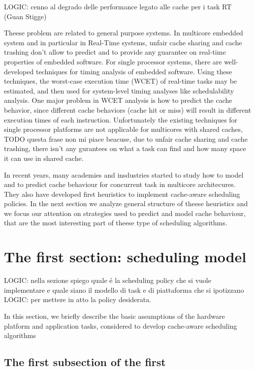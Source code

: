 \documentclass[a4paper,10pt]{article}
\begin{document}
\begin{multicols}{2}
LOGIC: cenno al degrado delle performance legato alle cache per i task RT (Guan Stigge)

Theese problem are related to general purpose systems. In multicore embedded system and in particular in Real-Time systems, unfair cache sharing 
and cache trashing don't allow to predict and to provide any guarantee on real-time properties of embedded software.
For single processor systems, there are well-developed techniques for timing analysis of embedded software.
Using these techniques, the worst-case execution time (WCET) of real-time tasks may be estimated, and then used for system-level 
timing analyses like schedulability analysis. One major problem in  WCET analysis is how to predict the cache behavior,
since different cache behaviors (cache hit or miss) will result in different execution times of each instruction.
Unfortunately the existing techniques for single processor platforms are not applicable for multicores with shared caches,
TODO questa frase non mi piace
beacuse, due to unfair cache sharing and cache trashing, there isn't any gurantees on what a task can find and how many space it can use in shared cache.

In recent years, many academies and insdustries started to study how to model and to predict cache behaviour for concurrent task in multicore architecures.
They also have developed first heuristics to implement cache-aware scheduling policies.
In the next section we analyze general structure of theese heuristics and we focus our attention on strategies used to predict and model cache behaviour,
that are the most interesting part of theese type of scheduling algorithms.


\section{The first section: scheduling model}

LOGIC: nella sezione spiego quale \'e la scheduling policy che si vuole implementare e quale siano il modello di task e di piattaforma che si ipotizzano
LOGIC: per mettere in atto la policy desiderata. 

In this section, we briefly describe the basic assumptions of the hardware platform and application tasks, considered to develop cache-aware 
scheduling algorithms

\subsection{The first subsection of the first}


\end{multicols}
\end{document}
